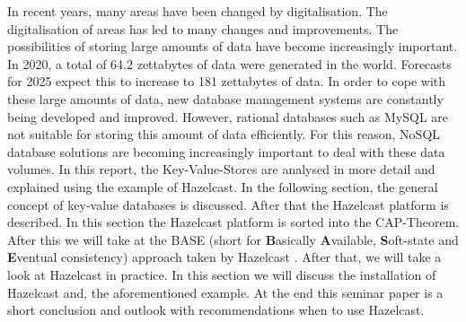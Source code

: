 
In recent years, many areas have been changed by digitalisation.
The digitalisation of areas has led to many changes and improvements. The
possibilities of storing large amounts of data have become increasingly
important. In 2020, a total of 64.2 zettabytes of data were generated in the
world. Forecasts for 2025 expect this to increase to 181 zettabytes of data. In
order to cope with these large amounts of data, new database management systems
are constantly being developed and improved. However, rational databases such as
MySQL are not suitable for storing this amount of data efficiently. For this
reason, NoSQL database solutions are becoming increasingly important to deal
with these data volumes. In this report, the Key-Value-Stores are analysed in
more detail and explained using the example of Hazelcast. In the following
section, the general concept of key-value databases is discussed.
\parencite{data_development_2012_2025, Key_Value_Datastore} After that the
Hazelcast platform is described. In this section the Hazelcast platform is sorted into
the CAP-Theorem. After this we will take at the BASE (short for
\textbf{B}asically \textbf{A}vailable, \textbf{S}oft-state and \textbf{E}ventual
consistency) \parencite{Brewer2000} approach taken by Hazelcast
\parencite{HZfailure}. After that, we will take a look at Hazelcast in practice.
In this section we will discuss the installation of Hazelcast and, the
aforementioned example. At the end this seminar paper is a short conclusion and
outlook with recommendations when to use Hazelcast.